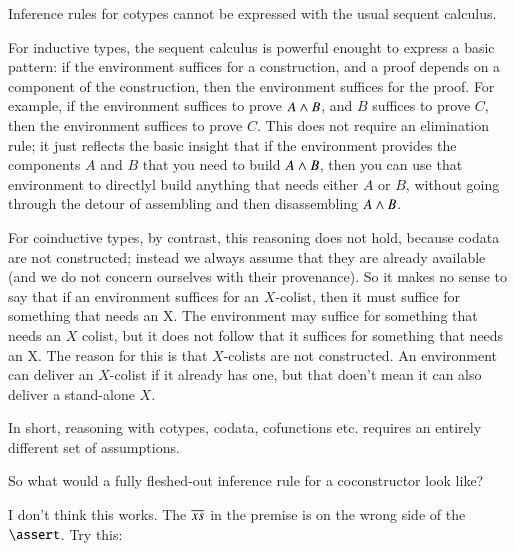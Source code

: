 Inference rules for cotypes cannot be expressed with the usual sequent
calculus.

For inductive types, the sequent calculus is powerful enought to
express a basic pattern: if the environment suffices for a
construction, and a proof depends on a component of the construction,
then the environment suffices for the proof. For example, if the
environment suffices to prove \(A\lkand B\), and \(B\) suffices to
prove \(C\), then the environment suffices to prove \(C\). This does
not require an elimination rule; it just reflects the basic insight
that if the environment provides the components \(A\) and \(B\) that
you need to build \(A\lkand B\), then you can use that environment to
directlyl build anything that needs either \(A\) or \(B\), without
going through the detour of assembling and then disassembling
\(A\lkand B\).

For coinductive types, by contrast, this reasoning does not hold,
because codata are not constructed; instead we always assume that they
are already available (and we do not concern ourselves with their
provenance). So it makes no sense to say that if an environment
suffices for an \(X\)-colist, then it must suffice for something that
needs an X. The environment may suffice for something that needs an
\(X\) colist, but it does not follow that it suffices for something
that needs an X. The reason for this is that \(X\)-colists are not
constructed. An environment can deliver an \(X\)-colist if it already
has one, but that doen't mean it can also deliver a stand-alone \(X\).

In short, reasoning with cotypes, codata, cofunctions etc. requires an
entirely different set of assumptions.

So what would a fully fleshed-out inference rule for a coconstructor
look like?

\begin{prooftree}
\end{prooftree}

I don't think this works. The \(\coseq{x}\) in the premise is on the wrong side of the \(\linfer\).  Try this:


